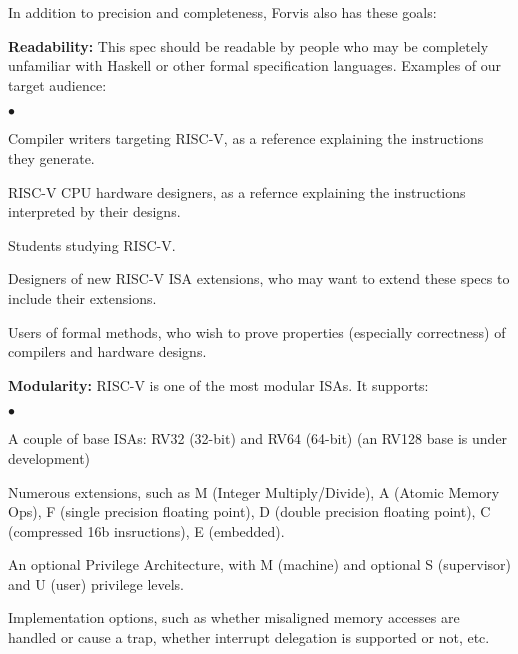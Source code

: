 \documentclass[11pt]{article}
\newenvironment{tightlist}%
{\begin{list}{$\bullet$}{%
    \setlength{\topsep}{0in}
    \setlength{\partopsep}{0in}
    \setlength{\itemsep}{0in}
    \setlength{\parsep}{0in}
    \setlength{\leftmargin}{1.5em}
    \setlength{\rightmargin}{0in}
    \setlength{\itemindent}{0in}
}
}%
{\end{list}
}
\begin{document}
In addition to precision and completeness, Forvis also has these goals:
\begin{itemize}

\item {\bf Readability:} This spec should be readable by people who
may be completely unfamiliar with Haskell or other formal
specification languages.  Examples of our target audience:

  \begin{tightlist}
   \item Compiler writers targeting RISC-V, as a reference explaining the instructions they generate.

   \item RISC-V CPU hardware designers, as a refernce explaining the instructions interpreted by their designs.

   \item Students studying RISC-V.

   \item Designers of new RISC-V ISA extensions, who may want to
   extend these specs to include their extensions.

   \item Users of formal methods, who wish to prove properties
   (especially correctness) of compilers and hardware designs.

  \end{tightlist}

\item {\bf Modularity:} RISC-V is one of the most modular ISAs.  It
supports:

  \begin{tightlist}
   \item A couple of base ISAs: RV32 (32-bit) and RV64 (64-bit) (an RV128 base is under development)

   \item Numerous extensions, such as M (Integer Multiply/Divide), A
    (Atomic Memory Ops), F (single precision floating point), D
    (double precision floating point), C (compressed 16b insructions), E (embedded).

   \item An optional Privilege Architecture, with M (machine) and
    optional S (supervisor) and U (user) privilege levels.

   \item Implementation options, such as whether misaligned memory
   accesses are handled or cause a trap, whether interrupt delegation
   is supported or not, etc.


\end{tightlist}
\end{itemize}
\end{document}
